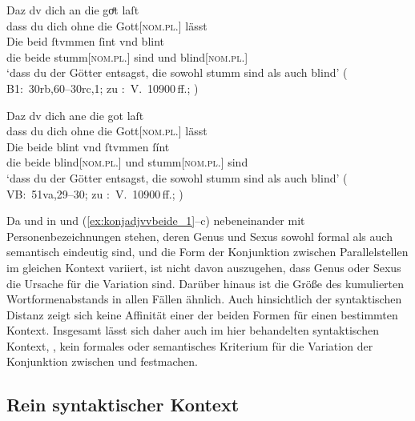 \begin{exe}
\begin{xlist}
	\ex \label{ex:konjadjvvbeide_4} %
		\gll Daz dv dich an die goͤt laſt \\
			dass du dich ohne die Gott[\textsc{nom.pl.\MascX}] lässt \\
	\sn \gll Die beid ſtvmmen ſint vnd blint \\
			die beide stumm[\textsc{nom.pl.\MascM}] sind und blind[\textsc{nom.pl.\MascM}] \\
		\trans `dass du der Götter entsagst, die sowohl stumm sind als
			auch blind'
			(%
				B1:~30rb,60--30rc,1; zu
				\KC:~V.~10900\,ff.;
				\cite[281]{schroeder1895}%
			)
	
	\ex \label{ex:konjadjvvbeide_5} %
		\gll Daz dv dich ane die got laſt \\
			dass du dich ohne die Gott[\textsc{nom.pl.\MascX}] lässt \\
	\sn \gll Die beide blint vnd ſtvmmen ſínt \\
			die beide blind[\textsc{nom.pl.\MascM}] und stumm[\textsc{nom.pl.\MascM}] sind \\
		\trans `dass du der Götter entsagst, die sowohl stumm sind als
			auch blind'
			(%
				VB:~51va,29--30; zu
				\KC:~V.~10900\,ff.;
				\cite[281]{schroeder1895}%
			)
	\end{xlist}
\end{exe}

Da  und  in  und
(\ref{ex:konjadjvvbeide_1}--c) nebeneinander mit
Personenbezeichnungen stehen, deren Genus und Sexus sowohl formal als auch
semantisch eindeutig sind, und die Form der Konjunktion zwischen
Parallelstellen im gleichen Kontext variiert, ist nicht davon auszugehen, dass
Genus oder Sexus die Ursache für die Variation sind. Darüber hinaus ist die
Größe des kumulierten Wortformenabstands in allen Fällen ähnlich. Auch
hinsichtlich der syntaktischen Distanz zeigt sich keine Affinität einer der
beiden Formen für einen bestimmten Kontext. Insgesamt lässt sich daher auch im
hier behandelten syntaktischen Kontext, , kein formales oder semantisches Kriterium für die
Variation der Konjunktion zwischen  und  festmachen.

\subsection{Rein syntaktischer Kontext}
\label{subsec:kcbeidquantsyncont}

